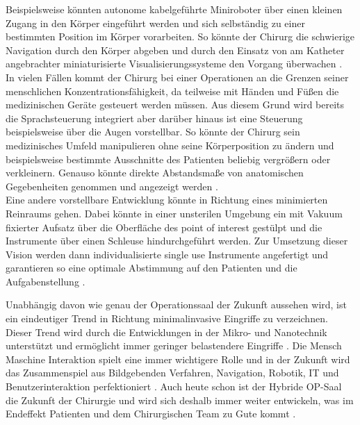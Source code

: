 Beispielsweise könnten autonome kabelgeführte Miniroboter über einen kleinen Zugang in den Körper eingeführt werden und sich selbständig zu einer bestimmten Position im Körper vorarbeiten. So könnte der Chirurg die schwierige Navigation durch den Körper abgeben und durch den Einsatz von am Katheter angebrachter miniaturisierte Visualisierungssysteme den Vorgang überwachen \cite{DerDigitaleOperationssaal}.\\
In vielen Fällen kommt der Chirurg bei einer Operationen an die Grenzen seiner menschlichen Konzentrationsfähigkeit, da teilweise mit Händen und Füßen die medizinischen Geräte gesteuert werden müssen. Aus diesem Grund wird bereits die Sprachsteuerung integriert aber darüber hinaus ist eine Steuerung beispielsweise über die Augen vorstellbar. So könnte der Chirurg sein medizinisches Umfeld manipulieren ohne seine Körperposition zu ändern und beispielsweise bestimmte Ausschnitte des Patienten beliebig vergrößern oder verkleinern. Genauso könnte direkte Abstandsmaße von anatomischen Gegebenheiten genommen und angezeigt werden \cite{DerDigitaleOperationssaal}. \\
Eine andere vorstellbare Entwicklung könnte in Richtung eines minimierten Reinraums gehen. Dabei könnte in einer unsterilen Umgebung ein mit Vakuum fixierter Aufsatz über die Oberfläche des \glqq point of interest\grqq{} gestülpt und die Instrumente über einen Schleuse hindurchgeführt werden. Zur Umsetzung dieser Vision werden dann individualisierte \glqq single use\grqq{} Instrumente angefertigt und garantieren so eine optimale Abstimmung auf den Patienten und die Aufgabenstellung \cite{DerDigitaleOperationssaal}.

Unabhängig davon wie genau der Operationssaal der Zukunft aussehen wird, ist ein eindeutiger Trend in Richtung minimalinvasive Eingriffe zu verzeichnen. Dieser Trend wird durch die Entwicklungen in der Mikro- und Nanotechnik unterstützt und ermöglicht immer geringer belastendere Eingriffe \cite{DerDigitaleOperationssaal}.
Die Mensch Maschine Interaktion spielt eine immer wichtigere Rolle und in der Zukunft wird das Zusammenspiel aus Bildgebenden Verfahren, Navigation, Robotik, IT und Benutzerinteraktion perfektioniert \cite{CurrentAndFuture}.
Auch heute schon ist der Hybride OP-Saal die Zukunft der Chirurgie und wird sich deshalb immer weiter entwickeln, was im Endeffekt Patienten und dem Chirurgischen Team zu Gute kommt \cite{Maquet}.


	
	



